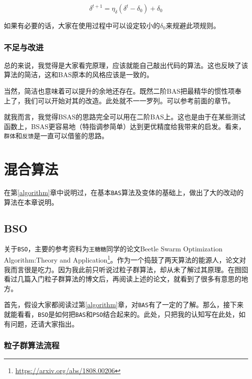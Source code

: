 \documentclass[]{ctexbook}
\renewcommand{\href}[2]{#2\footnote{\url{#1}}}
\theoremstyle{definition}
\theoremstyle{definition}
\theoremstyle{definition}
\theoremstyle{remark}
\begin{document}
\begin{equation}
\delta^{t+1}=\eta_{\delta}(\delta^{t}-\delta_0) + \delta_0
\label{eq:bas2stepupdate}
\end{equation}

如果有必要的话，大家在使用过程中可以设定较小的\(\delta_0\)来规避此项规则。

\subsection{不足与改进}

总的来说，我觉得是大家看完原理，应该就能自己敲出代码的算法。这也反映了该算法的简洁，这和BAS原本的风格应该是一致的。

当然，简洁也意味着可以提升的余地还存在。既然二阶BAS把最精华的惯性项奉上了，我们可以开始对其的改造。此处就不一一罗列。可以参考前面的章节。

就我而言，我觉得BSAS的思路完全可以用在二阶BAS上。这也是由于在某些测试函数上，BSAS更容易地（特指调参简单）达到更优精度给我带来的启发。看来，\texttt{群体}和\texttt{反馈}是一直可以借鉴的思路。

\chapter{混合算法}\label{mixedalgorithm}

在第\ref{algorithm}章中说明过，在基本\texttt{BAS}算法及变体的基础上，做出了大的改动的算法在本章说明。

\section{BSO}\label{bso}

关于\texttt{BSO}，主要的参考资料为\texttt{王糖糖}同学的论文\href{https://arxiv.org/abs/1808.00206}{Beetle
Swarm Optimization Algorithm:Theory and
Application}。作为一个捣鼓了两天算法的能源人，论文对我而言很是吃力。因为我此前只听说过粒子群算法，却从未了解过其原理。在囫囵看过几篇入门粒子群算法的博文后，再阅读上述的论文，就看到了很多有意思的地方。

首先，假设大家都阅读过第\ref{algorithm}章，对\texttt{BAS}有了一定的了解。那么，接下来就能看看，\texttt{BSO}是如何把\texttt{BAS}和\texttt{PSO}结合起来的。此处，只把我的认知写在此处，如有问题，还请大家指出。

\subsection{粒子群算法流程}
\end{document}
